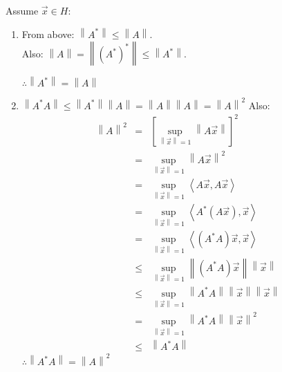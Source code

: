 \documentclass[letterpaper,12pt,fleqn]{article}
\newcommand{\vx}{\vec{x}}
\newcommand{\norm}[1]{\left\|#1\right\|}
\newcommand{\inner}[1]{\left<#1\right>}
\begin{document}
\begin{theproof}
  Assume $\vx\in H$:
  \begin{enumerate}
    \item From above: $\norm{A^*}\le\norm{A}$. \\
      Also: $\norm{A}=\norm{(A^*)^*}\le\norm{A^*}$.

      $\therefore\norm{A^*}=\norm{A}$

    \item $\norm{A^*A}\le\norm{A^*}\norm{A}=\norm{A}\norm{A}=\norm{A}^2$
      Also:
      \begin{eqnarray*}
        \norm{A}^2 &=& \left[\sup_{\norm{\vx}=1}\norm{A\vx}\right]^2 \\
        &=& \sup_{\norm{\vx}=1}\norm{A\vx}^2 \\
        &=& \sup_{\norm{\vx}=1}\inner{A\vx,A\vx} \\
        &=& \sup_{\norm{\vx}=1}\inner{A^*(A\vx),\vx} \\
        &=& \sup_{\norm{\vx}=1}\inner{(A^*A)\vx,\vx} \\
        &\le& \sup_{\norm{\vx}=1}\norm{(A^*A)\vx}\norm{\vx} \\
        &\le& \sup_{\norm{\vx}=1}\norm{A^*A}\norm{\vx}\norm{\vx} \\
        &=& \sup_{\norm{\vx}=1}\norm{A^*A}\norm{\vx}^2 \\
        &\le& \norm{A^*A}
      \end{eqnarray*}
      $\therefore\norm{A^*A}=\norm{A}^2$
  \end{enumerate}
\end{theproof}
\end{document}
